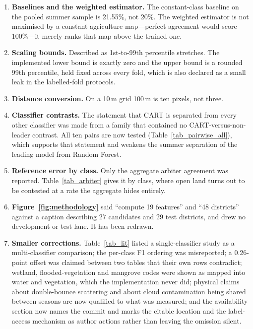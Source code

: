 \documentclass[conference]{IEEEtran}
\begin{document}
\begin{enumerate}
    \item \textbf{Baselines and the weighted estimator.} The constant-class baseline on the pooled summer sample is 21.55\%, not 20\%. The weighted estimator is not maximised by a constant agriculture map---perfect agreement would score 100\%---it merely ranks that map above the trained one.
    \item \textbf{Scaling bounds.} Described as 1st-to-99th percentile stretches. The implemented lower bound is exactly zero and the upper bound is a rounded 99th percentile, held fixed across every fold, which is also declared as a small leak in the labelled-fold protocols.
    \item \textbf{Distance conversion.} On a 10\,m grid 100\,m is ten pixels, not three.
    \item \textbf{Classifier contrasts.} The statement that CART is separated from every other classifier was made from a family that contained no CART-versus-non-leader contrast. All ten pairs are now tested (Table~\ref{tab_pairwise_all}), which supports that statement and weakens the summer separation of the leading model from Random Forest.
    \item \textbf{Reference error by class.} Only the aggregate arbiter agreement was reported. Table~\ref{tab_arbiter} gives it by class, where open land turns out to be contested at a rate the aggregate hides entirely.
    \item \textbf{Figure~\ref{fig:methodology}} said ``compute 19 features'' and ``48 districts'' against a caption describing 27 candidates and 29 test districts, and drew no development or test lane. It has been redrawn.
    \item \textbf{Smaller corrections.} Table~\ref{tab_lit} listed a single-classifier study as a multi-classifier comparison; the per-class F1 ordering was misreported; a 0.26-point offset was claimed between two tables that their own rows contradict; wetland, flooded-vegetation and mangrove codes were shown as mapped into water and vegetation, which the implementation never did; physical claims about double-bounce scattering and about cloud contamination being shared between seasons are now qualified to what was measured; and the availability section now names the commit and marks the citable location and the label-access mechanism as author actions rather than leaving the omission silent.
\end{enumerate}
\end{document}
